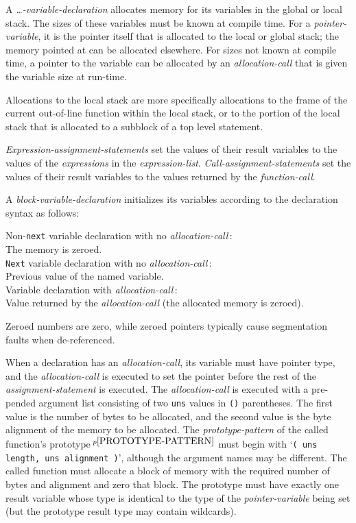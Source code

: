 \documentclass[12pt]{article}
\newcommand{\pagnote}[1]{$\,^{p\pageref{#1}}$}
\newenvironment{indpar}[1][0.3in]%
	{\begin{list}{}%
		     {\setlength{\itemsep}{0in}%
		      \setlength{\topsep}{0in}%
		      \setlength{\parsep}{1ex}%
		      \setlength{\labelwidth}{#1}%
		      \setlength{\leftmargin}{#1}%
		      \addtolength{\leftmargin}{\labelsep}}%
	 \item}%
	{\end{list}}
\begin{document}
A {\em \ldots-variable-declaration}\label{VARIABLE-ALLOCATION}
allocates memory for its variables in the global or local stack.
The sizes of these variables must be known at compile time.
For a {\em pointer-variable}, it is the pointer itself that is
allocated to the local or global stack; the
memory pointed at can be allocated elsewhere.
For sizes not known at compile time, a pointer to the variable
can be allocated by an {\em allocation-call} that is given the variable
size at run-time.

Allocations to the local stack are more specifically allocations to the
frame of the current out-of-line function within the local stack,
or to the portion of the local stack that is allocated to
a subblock of a top level statement.

{\em Expression-assignment-statements} set the values of their result variables
to the values of the {\em expressions} in the {\em expression-list}.
{\em Call-assignment-statements} set the values of their result variables
to the values returned by the {\em function-call}.

A {\em block-variable-declaration}\label{VARIABLE-INITIALIZATION}
initializes its variables
according to the declaration syntax as follows:
\begin{indpar}[0.05in]
Non-{\tt next} variable declaration with no {\em allocation-call}\,: \\
\hspace*{3em}The memory is zeroed. \\
{\tt Next} variable declaration with no {\em allocation-call}\,: \\
\hspace*{3em}Previous value of the named variable. \\
Variable declaration with {\em allocation-call}\,: \\
\hspace*{3em}Value returned by the {\em allocation-call}
             (the allocated memory is zeroed).
\end{indpar}
Zeroed numbers are zero, while zeroed pointers typically
cause segmentation faults when de-referenced.

When a declaration has an {\em allocation-call}\label{ALLOCATION-CALLS},
its variable must have pointer
type, and the {\em allocation-call} is executed to set the pointer
before the rest of the {\em assignment-statement} is
executed.  The {\em allocation-call} is executed
with a pre-pended argument list consisting of two {\tt uns} values
in {\tt ()} parentheses.  The first value is the number of bytes to
be allocated, and the second value is the byte alignment of the
memory to be allocated.
The {\em prototype-pattern}
of the called function's prototype\pagnote{PROTOTYPE-PATTERN}
must begin with `{\tt ( uns length, uns alignment )}', although
the argument names may be different.
The called function must allocate a block of
memory with the required number of bytes and alignment and zero that
block.  The prototype must have
exactly one result variable whose type is identical to
the type of the {\em pointer-variable} being set (but the
prototype result type may contain wildcards).
\end{document}
